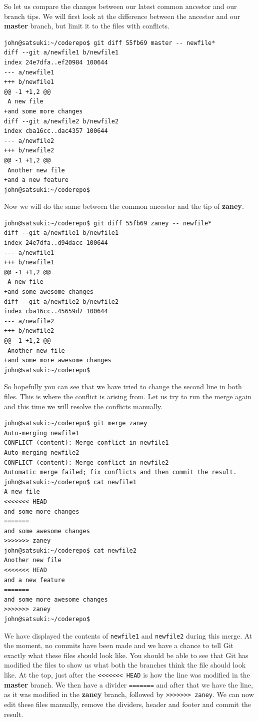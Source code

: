 So let us compare the changes between our latest common ancestor and our branch tips.
We will first look at the difference between the ancestor and our \textbf{master} branch, but limit it to the files with conflicts.

\begin{Verbatim}
john@satsuki:~/coderepo$ git diff 55fb69 master -- newfile*
diff --git a/newfile1 b/newfile1
index 24e7dfa..ef20984 100644
--- a/newfile1
+++ b/newfile1
@@ -1 +1,2 @@
 A new file
+and some more changes
diff --git a/newfile2 b/newfile2
index cba16cc..dac4357 100644
--- a/newfile2
+++ b/newfile2
@@ -1 +1,2 @@
 Another new file
+and a new feature
john@satsuki:~/coderepo$
\end{Verbatim}

Now we will do the same between the common ancestor and the tip of \textbf{zaney}.

\begin{Verbatim}
john@satsuki:~/coderepo$ git diff 55fb69 zaney -- newfile*
diff --git a/newfile1 b/newfile1
index 24e7dfa..d94dacc 100644
--- a/newfile1
+++ b/newfile1
@@ -1 +1,2 @@
 A new file
+and some awesome changes
diff --git a/newfile2 b/newfile2
index cba16cc..45659d7 100644
--- a/newfile2
+++ b/newfile2
@@ -1 +1,2 @@
 Another new file
+and some more awesome changes
john@satsuki:~/coderepo$
\end{Verbatim}

So hopefully you can see that we have tried to change the second line in both files.
This is where the conflict is arising from.
Let us try to run the merge again and this time we will resolve the conflicts manually.

\begin{Verbatim}
john@satsuki:~/coderepo$ git merge zaney
Auto-merging newfile1
CONFLICT (content): Merge conflict in newfile1
Auto-merging newfile2
CONFLICT (content): Merge conflict in newfile2
Automatic merge failed; fix conflicts and then commit the result.
john@satsuki:~/coderepo$ cat newfile1
A new file
<<<<<<< HEAD
and some more changes
=======
and some awesome changes
>>>>>>> zaney
john@satsuki:~/coderepo$ cat newfile2
Another new file
<<<<<<< HEAD
and a new feature
=======
and some more awesome changes
>>>>>>> zaney
john@satsuki:~/coderepo$
\end{Verbatim}

We have displayed the contents of \texttt{newfile1} and \texttt{newfile2} during this merge.
At the moment, no commits have been made and we have a chance to tell Git exactly what these files should look like.
You should be able to see that Git has modified the files to show us what both the branches think the file should look like.
At the top, just after the \texttt{<<<<<<< HEAD} is how the line was modified in the \textbf{master} branch.
We then have a divider \texttt{=======} and after that we have the line, as it was modified in the \textbf{zaney} branch, followed by \texttt{>>>>>>> zaney}.
We can now edit these files manually, remove the dividers, header and footer and commit the result.

